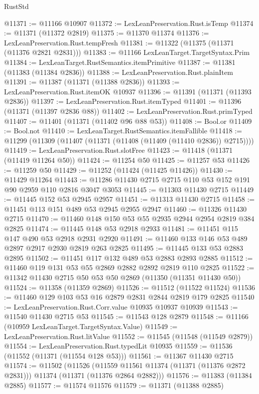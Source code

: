 \begin{lexlean}{RustStd}
\begin{coremodule}
@11371 := @11166 @10907
@11372 := LexLeanPreservation.Rust.isTemp
@11374 := @11371 (@11372 @2819)
@11375 := @11370 @11374
@11376 := LexLeanPreservation.Rust.tempFresh
@11381 := @11322 (@11375 (@11371 (@11376 @2821 @2831)))
@11383 := @11166 LexLeanTarget.TargetSyntax.Prim
@11384 := LexLeanTarget.RustSemantics.itemPrimitive
@11387 := @11381 (@11383 (@11384 @2836))
@11388 := LexLeanPreservation.Rust.plainItem
@11391 := @11387 (@11371 (@11388 @2836))
@11393 := LexLeanPreservation.Rust.itemOK @10937
@11396 := @11391 (@11371 (@11393 @2836))
@11397 := LexLeanPreservation.Rust.itemTyped
@11401 := @11396 (@11371 (@11397 @2836 @88))
@11402 := LexLeanPreservation.Rust.primTyped
@11407 := @11401 (@11371 (@11402 @96 @88 @53))
@11408 := Bool.or
@11409 := Bool.not
@11410 := LexLeanTarget.RustSemantics.itemFallible
@11418 := @11299 (@11309 (@11407 (@11371 (@11408 (@11409 (@11410 @2836)) @2715))))
@11419 := LexLeanPreservation.Rust.slotFree
@11423 := @11418 (@11371 (@11419 @11264 @50))
@11424 := @11254 @50
@11425 := @11257 @53
@11426 := @11259 @50
@11429 := @11252 (@11424 (@11425 @11426))
@11430 := @11429 @11264
@11443 := @11286 @11430 @2715 @2715 @110 @53 @152 @191 @90 @2959 @110 @2816 @3047 @3053
@11445 := @11303 @11430 @2715
@11449 := @11445 @152 @53 @2945 @2957
@11451 := @11313 @11430 @2715
@11458 := @11451 @113 @151 @489 @53 @2945 @2955 @2947
@11460 := @11326 @11430 @2715
@11470 := @11460 @148 @150 @53 @55 @2935 @2944 @2954 @2819 @384 @2825
@11474 := @11445 @148 @53 @2918 @2933
@11481 := @11451 @115 @147 @490 @53 @2918 @2931 @2920
@11491 := @11460 @133 @146 @53 @489 @2897 @2917 @2930 @2819 @263 @2825
@11495 := @11445 @133 @53 @2883 @2895
@11502 := @11451 @117 @132 @489 @53 @2883 @2893 @2885
@11512 := @11460 @119 @131 @53 @55 @2869 @2882 @2892 @2819 @110 @2825
@11522 := @11342 @11430 @2715 @50 @53 @50 @2869 (@11350 (@11351 @11430 @50))
@11524 := @11358 (@11359 @2869)
@11526 := @11512 (@11522 @11524)
@11536 := @11460 @129 @103 @53 @16 @2879 @2831 @2844 @2819 @179 @2825
@11540 := LexLeanPreservation.Rust.Corr.value @10935 @10937 @10939
@11543 := @11540 @11430 @2715 @53
@11545 := @11543 @128 @2879
@11548 := @11166 (@10959 LexLeanTarget.TargetSyntax.Value)
@11549 := LexLeanPreservation.Rust.litValue
@11552 := @11545 (@11548 (@11549 @2879))
@11554 := LexLeanPreservation.Rust.typedLit @10935
@11559 := @11536 (@11552 (@11371 (@11554 @128 @53)))
@11561 := @11367 @11430 @2715
@11574 := @11502
    (@11526
      (@11559 @11561 @11374 (@11371 (@11376 @2872 @2831)))
      @11374
      (@11371 (@11376 @2864 @2882)))
@11576 := @11383 (@11384 @2885)
@11577 := @11574 @11576
@11579 := @11371 (@11388 @2885)

\end{coremodule}
\end{lexlean}
